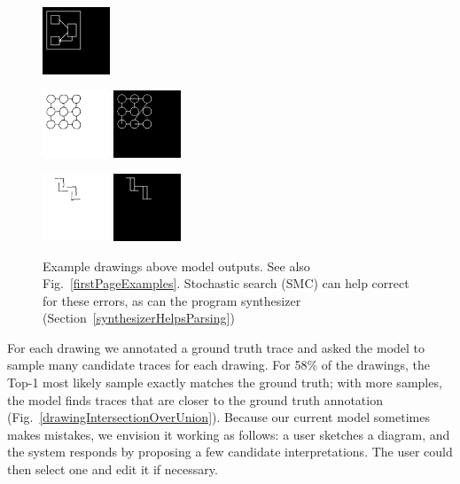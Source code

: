 \documentclass{article}
\newcommand{\remark}[1]{\textcolor{red}{[#1]}}
\begin{document}
\begin{figure}[H]
\begin{minipage}[t]{2.25cm}
    \includegraphics[width = 2cm]{figures/0-parse.png}    
  \end{minipage}
  \begin{minipage}[t]{2.25cm}
    \includegraphics[width = 2cm]{figures/expert-38.png}
    \includegraphics[width = 2cm]{figures/38-parse.png}    
  \end{minipage}
  \begin{minipage}[t]{2.25cm}
    \includegraphics[width = 2cm]{figures/expert-34.png}
    \includegraphics[width = 2cm]{figures/34-parse.png}     
    \end{minipage}
  \caption{Example drawings above model outputs. See also Fig.~\ref{firstPageExamples}. Stochastic search (SMC) can help correct for these errors, as can the program synthesizer (Section~\ref{synthesizerHelpsParsing})}\label{lotsOfHandDrawings}%
\end{figure}
For each drawing we annotated a ground truth trace and asked the model
to sample many candidate traces for each drawing.
For 58\% of the drawings, the Top-1 most likely sample exactly matches the
ground truth; with more samples, the model finds traces
that are closer to the ground truth annotation (Fig.~\ref{drawingIntersectionOverUnion}).
Because our current model sometimes makes mistakes, %
we envision it working as follows:
a user sketches a diagram,
and the system responds by proposing a few candidate interpretations.
The user could then select one and edit it if necessary.
\end{document}

